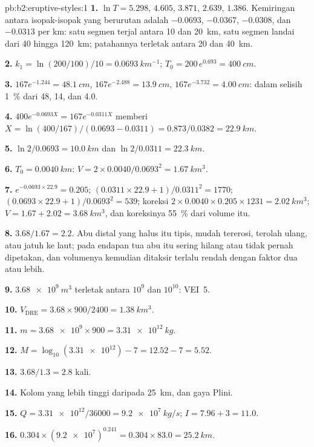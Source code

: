 \begin{solution}{pb:b2:eruptive-styles:1}
\textbf{1.} $\ln T = 5.298$, $4.605$, $3.871$, $2.639$, $1.386$. Kemiringan antara
isopak-isopak yang berurutan adalah $-0.0693$, $-0.0367$, $-0.0308$, dan $-0.0313$ per km: satu
segmen terjal antara 10 dan \qty{20}{km}, satu segmen landai dari 40 hingga
\qty{120}{km}; patahannya terletak antara 20 dan \qty{40}{km}.

\textbf{2.} $k_1 = \ln(200/100)/10 = \qty{0.0693}{km^{-1}}$; $T_0 = 200\,e^{0.693} =
\qty{400}{cm}$.

\textbf{3.} $167e^{-1.244} = \qty{48.1}{cm}$, $167e^{-2.488} = \qty{13.9}{cm}$,
$167e^{-3.732} = \qty{4.00}{cm}$: dalam selisih \qty{1}{\percent} dari 48, 14, dan 4.0.

\textbf{4.} $400e^{-0.0693X} = 167e^{-0.0311X}$ memberi $X = \ln(400/167)/(0.0693 -
0.0311) = 0.873/0.0382 = \qty{22.9}{km}$.

\textbf{5.} $\ln2/0.0693 = \qty{10.0}{km}$ dan $\ln2/0.0311 = \qty{22.3}{km}$.

\textbf{6.} $T_0 = \qty{0.0040}{km}$: $V = 2\times0.0040/0.0693^2 =
\qty{1.67}{km^3}$.

\textbf{7.} $e^{-0.0693\times22.9} = 0.205$; $(0.0311\times22.9 + 1)/0.0311^2 = 1770$;
$(0.0693\times22.9 + 1)/0.0693^2 = 539$; koreksi $2\times0.0040\times0.205\times1231 =
\qty{2.02}{km^3}$; $V = 1.67 + 2.02 = \qty{3.68}{km^3}$, dan koreksinya
\qty{55}{\percent} dari volume itu.

\textbf{8.} $3.68/1.67 = 2.2$. Abu distal yang halus itu tipis, mudah tererosi,
terolah ulang, atau jatuh ke laut; pada endapan tua abu itu sering hilang atau tidak pernah
dipetakan, dan volumenya kemudian ditaksir terlalu rendah dengan faktor dua atau lebih.

\textbf{9.} $\qty{3.68e9}{m^3}$ terletak antara $10^9$ dan $10^{10}$: VEI~5.

\textbf{10.} $V_{\mathrm{DRE}} = 3.68\times900/2400 = \qty{1.38}{km^3}$.

\textbf{11.} $m = \num{3.68e9}\times900 = \qty{3.31e12}{kg}$.

\textbf{12.} $M = \log_{10}(\num{3.31e12}) - 7 = 12.52 - 7 = 5.52$.

\textbf{13.} $3.68/1.3 = 2.8$ kali.

\textbf{14.} Kolom yang lebih tinggi daripada \qty{25}{km}, dan gaya Plini.

\textbf{15.} $Q = \num{3.31e12}/36000 = \qty{9.2e7}{kg/s}$; $I = 7.96 + 3 = 11.0$.

\textbf{16.} $0.304\times(\num{9.2e7})^{0.241} = 0.304\times83.0 = \qty{25.2}{km}$.


\end{solution}
